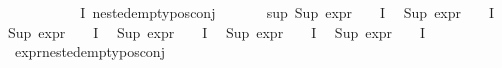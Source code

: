 \begin{isabellebody}
\ \ \isamarkupfalse%
\isanewline
\ \ \ \ \isamarkupfalse%
\ {\isachardoublequoteopen}{\isacharparenleft}{\kern0pt}{\isasymforall}{\isasympsi}{\isasymin}{\isasymPhi}\ {\isacharbackquote}{\kern0pt}\ I{\isachardot}{\kern0pt}\ nested{\isacharunderscore}{\kern0pt}empty{\isacharunderscore}{\kern0pt}pos{\isacharunderscore}{\kern0pt}conj\ {\isasympsi}{\isacharparenright}{\kern0pt}{\isachardoublequoteclose}\isanewline
\ \ \ \ \isamarkupfalse%
\ sup{\isacharunderscore}{\kern0pt}{\isasymphi}{\isacharcolon}{\kern0pt}\ {\isachardoublequoteopen}Sup\ {\isacharparenleft}{\kern0pt}{\isacharparenleft}{\kern0pt}expr{\isacharunderscore}{\kern0pt}{}\ {\isasymcirc}\ {\isasymPhi}{\isacharparenright}{\kern0pt}\ {\isacharbackquote}{\kern0pt}\ I{\isacharparenright}{\kern0pt}\ {\isasymle}\ {}{\isachardoublequoteclose}\isanewline
{\isachardoublequoteopen}Sup\ {\isacharparenleft}{\kern0pt}{\isacharparenleft}{\kern0pt}expr{\isacharunderscore}{\kern0pt}{}\ {\isasymcirc}\ {\isasymPhi}{\isacharparenright}{\kern0pt}\ {\isacharbackquote}{\kern0pt}\ I{\isacharparenright}{\kern0pt}\ {\isasymle}\ {\isasyminfinity}{\isachardoublequoteclose}\isanewline
{\isachardoublequoteopen}Sup\ {\isacharparenleft}{\kern0pt}{\isacharparenleft}{\kern0pt}expr{\isacharunderscore}{\kern0pt}{}\ {\isasymcirc}\ {\isasymPhi}{\isacharparenright}{\kern0pt}\ {\isacharbackquote}{\kern0pt}\ I{\isacharparenright}{\kern0pt}\ {\isasymle}\ {}{\isachardoublequoteclose}\isanewline
{\isachardoublequoteopen}Sup\ {\isacharparenleft}{\kern0pt}{\isacharparenleft}{\kern0pt}expr{\isacharunderscore}{\kern0pt}{}\ {\isasymcirc}\ {\isasymPhi}{\isacharparenright}{\kern0pt}\ {\isacharbackquote}{\kern0pt}\ I{\isacharparenright}{\kern0pt}\ {\isasymle}\ {}{\isachardoublequoteclose}\isanewline
{\isachardoublequoteopen}Sup\ {\isacharparenleft}{\kern0pt}{\isacharparenleft}{\kern0pt}expr{\isacharunderscore}{\kern0pt}{}\ {\isasymcirc}\ {\isasymPhi}{\isacharparenright}{\kern0pt}\ {\isacharbackquote}{\kern0pt}\ I{\isacharparenright}{\kern0pt}\ {\isasymle}\ {}{\isachardoublequoteclose}\isanewline
{\isachardoublequoteopen}Sup\ {\isacharparenleft}{\kern0pt}{\isacharparenleft}{\kern0pt}expr{\isacharunderscore}{\kern0pt}{}\ {\isasymcirc}\ {\isasymPhi}{\isacharparenright}{\kern0pt}\ {\isacharbackquote}{\kern0pt}\ I{\isacharparenright}{\kern0pt}\ {\isasymle}\ {}{\isachardoublequoteclose}\isanewline
\ \ \ \ \ \ \isamarkupfalse%
\ expr{\isacharunderscore}{\kern0pt}nested{\isacharunderscore}{\kern0pt}empty{\isacharunderscore}{\kern0pt}pos{\isacharunderscore}{\kern0pt}conj\isanewline

\end{isabellebody}
